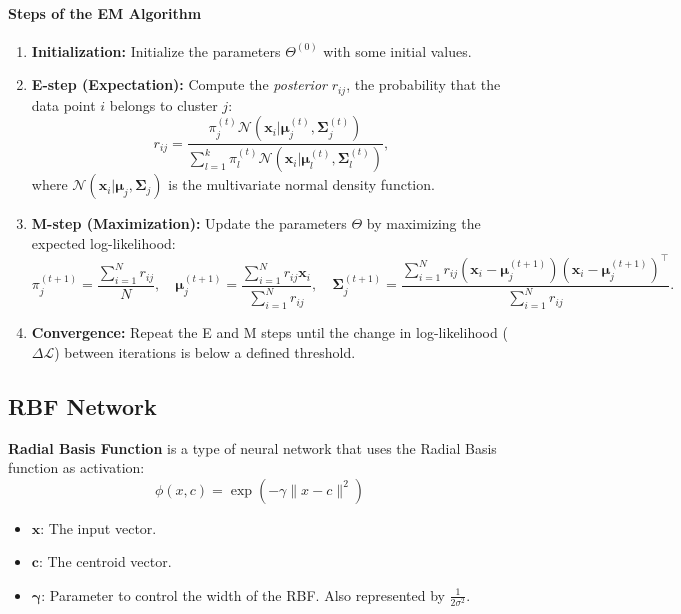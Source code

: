\documentclass[a4paper,12pt]{article}
\begin{document}
\paragraph{Steps of the EM Algorithm}
\begin{enumerate}
    \item \textbf{Initialization:} Initialize the parameters \(\Theta^{(0)}\) with some initial values.
    \item \textbf{E-step (Expectation):} Compute the \textit{posterior} \(r_{ij}\), the probability that the data point \(i\) belongs to cluster \(j\):
    \[
    r_{ij} = \frac{\pi_j^{(t)} \mathcal{N}(\mathbf{x}_i | \boldsymbol{\mu}_j^{(t)}, \boldsymbol{\Sigma}_j^{(t)})}{\sum_{l=1}^k \pi_l^{(t)} \mathcal{N}(\mathbf{x}_i | \boldsymbol{\mu}_l^{(t)}, \boldsymbol{\Sigma}_l^{(t)})},
    \]
    where \(\mathcal{N}(\mathbf{x}_i | \boldsymbol{\mu}_j, \boldsymbol{\Sigma}_j)\) is the multivariate normal density function.
    
    \item \textbf{M-step (Maximization):} Update the parameters \(\Theta\) by maximizing the expected log-likelihood:
    \[
    \pi_j^{(t+1)} = \frac{\sum_{i=1}^N r_{ij}}{N}, \quad
    \boldsymbol{\mu}_j^{(t+1)} = \frac{\sum_{i=1}^N r_{ij} \mathbf{x}_i}{\sum_{i=1}^N r_{ij}}, \quad
    \boldsymbol{\Sigma}_j^{(t+1)} = \frac{\sum_{i=1}^N r_{ij} (\mathbf{x}_i - \boldsymbol{\mu}_j^{(t+1)})(\mathbf{x}_i - \boldsymbol{\mu}_j^{(t+1)})^\top}{\sum_{i=1}^N r_{ij}}.
    \]

    \item \textbf{Convergence:} Repeat the E and M steps until the change in log-likelihood (\(\Delta \mathcal{L}\)) between iterations is below a defined threshold.
\end{enumerate}


\subsection{RBF Network}
\textbf{Radial Basis Function} is a type of neural network that uses the Radial Basis function as activation:
\[
\phi(x, c) = \exp\left(-\gamma \|x - c\|^2\right)
\]
\begin{itemize}
    \item \(\mathbf{x}\): The input vector.
    \item \(\mathbf{c}\): The centroid vector.
    \item \(\mathbf{\gamma}\): Parameter to control the width of the RBF. Also represented by \(\frac{1}{2\sigma^2}\).
\end{itemize}
\end{document}
